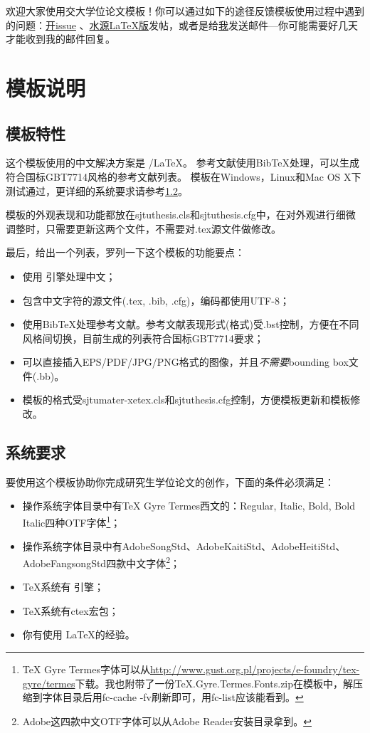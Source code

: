 欢迎大家使用交大学位论文模板！你可以通过如下的途径反馈模板使用过程中遇到的问题：\href{https://github.com/weijianwen/sjtu-thesis-template-latex/issues}{开issue}
、\href{https://bbs.sjtu.edu.cn/bbsdoc?board=TeX_LaTeX}{水源LaTeX版}发帖，或者是给\href{mailto:weijianwen@gmail.com}{我}发送邮件---你可能需要好几天才能收到我的邮件回复。

\section{模板说明}
\subsection{模板特性}
\label{sec:features}

这个模板使用的中文解决方案是 \XeTeX/\LaTeX 。
参考文献使用BibTeX处理，可以生成符合国标GBT7714风格的参考文献列表。
模板在Windows，Linux和Mac OS X下测试通过，更详细的系统要求请参考\ref{sec:requirements}。

模板的外观表现和功能都放在sjtuthesis.cls和sjtuthesis.cfg中，在对外观进行细微调整时，只需要更新这两个文件，不需要对.tex源文件做修改。

最后，给出一个列表，罗列一下这个模板的功能要点：

\begin{itemize}
\item 使用 \XeTeX 引擎处理中文；
\item 包含中文字符的源文件(.tex, .bib, .cfg)，编码都使用UTF-8；
\item 使用BibTeX处理参考文献。参考文献表现形式(格式)受.bst控制，方便在不同风格间切换，目前生成的列表符合国标GBT7714要求；
\item 可以直接插入EPS/PDF/JPG/PNG格式的图像，并且\emph{不需要}bounding box文件(.bb)。
\item 模板的格式受sjtumater-xetex.cls和sjtuthesis.cfg控制，方便模板更新和模板修改。
\end{itemize}

\subsection{系统要求}
\label{sec:requirements}

要使用这个模板协助你完成研究生学位论文的创作，下面的条件必须满足：

\begin{itemize}
\item 操作系统字体目录中有TeX Gyre Termes西文的：Regular, Italic, Bold, Bold Italic四种OTF字体\footnote{TeX Gyre Termes字体可以从\href{http://www.gust.org.pl/projects/e-foundry/tex-gyre/termes}{http://www.gust.org.pl/projects/e-foundry/tex-gyre/termes}下载。我也附带了一份TeX.Gyre.Termes.Fonts.zip在模板中，解压缩到字体目录后用fc-cache -fv刷新即可，用fc-list应该能看到。}；
\item 操作系统字体目录中有AdobeSongStd、AdobeKaitiStd、AdobeHeitiStd、AdobeFangsongStd四款中文字体\footnote{Adobe这四款中文OTF字体可以从Adobe Reader安装目录拿到。}；
\item \TeX 系统有 \XeTeX 引擎；
\item \TeX 系统有ctex宏包；
\item 你有使用 \LaTeX 的经验。
\end{itemize}

